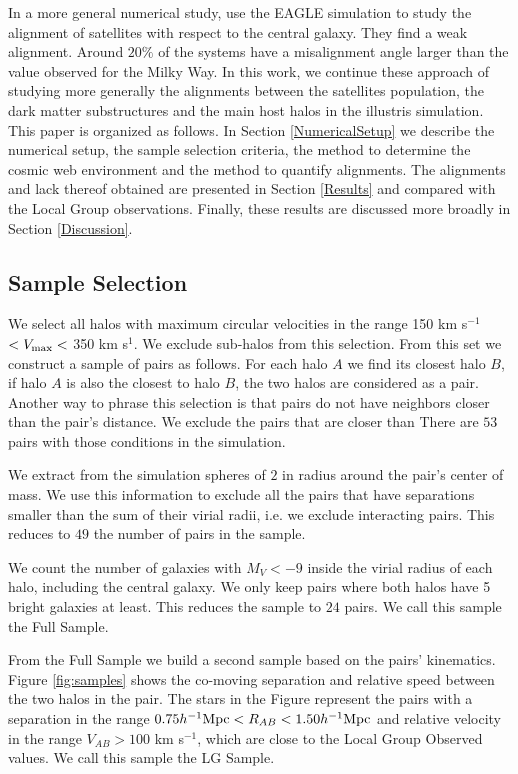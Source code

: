 In a more general numerical study,   
\cite{2016arXiv160501728S} use the EAGLE simulation to study the
alignment of satellites with respect to the central galaxy. They find
a weak alignment. Around $20\%$ of the systems have a misalignment
angle larger than the value observed for the Milky Way.
In this work, we continue these approach of studying more generally the alignments between the satellites population, the dark matter substructures and the main host halos in the illustris simulation. This paper is organized as follows. 
In Section \ref{NumericalSetup} we describe the numerical setup, the sample selection criteria, the method to determine the cosmic web environment and the method to quantify alignments. 
The alignments and lack thereof obtained are presented in Section \ref{Results} and compared with the Local Group observations.
Finally, these results are discussed more broadly in Section \ref{Discussion}.





\subsection{Sample Selection}

We select all halos with maximum circular velocities in the
range 150 km s$^{-1}$ $<V_{\rm max}<$ 350 km s$^{1}$.
We exclude sub-halos from this selection.
From this set we construct a sample of pairs as follows.
For each halo $A$ we find its closest halo $B$, if halo $A$ is also
the closest to halo $B$, the two halos are considered as a pair. 
Another way to phrase this selection is that pairs do not have
neighbors closer than the pair's distance.
We exclude the pairs that are closer than
There are $53$ pairs with those conditions in the simulation.

We extract from the simulation spheres of $2$ \hMpc  in radius around
the pair's center of mass. 
We use this information to exclude all the pairs that have separations
smaller than the sum of their virial radii, i.e. we exclude
interacting pairs. 
This reduces to $49$ the number of pairs in the sample.

We count the number of galaxies with $M_V<-9$ inside the virial
radius of each halo, including the central galaxy.
We only keep pairs where both halos have 5 bright galaxies at least. 
This reduces the sample to $24$ pairs. 
We call this sample the Full Sample.

From the Full Sample we build a second sample based on the pairs' kinematics. 
Figure \ref{fig:samples} shows the co-moving separation and relative
speed between the two halos in the pair.
The stars in the Figure represent the pairs with a separation in the
range $0.75\hMpc <R_{AB}< 1.50\hMpc$ and relative velocity in the
range $V_{AB}>100$ km s$^{-1}$, which are close to the Local Group
Observed values.
We call this sample the LG Sample.

